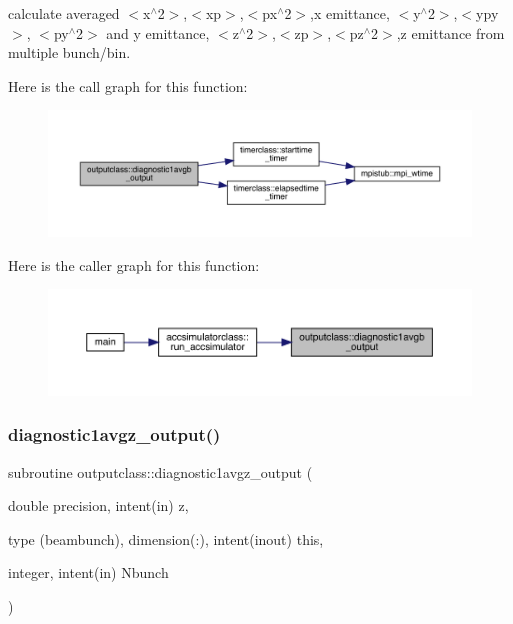 calculate averaged $<$x$^\wedge$2$>$,$<$xp$>$,$<$px$^\wedge$2$>$,x emittance, $<$y$^\wedge$2$>$,$<$ypy$>$, $<$py$^\wedge$2$>$ and y emittance, $<$z$^\wedge$2$>$,$<$zp$>$,$<$pz$^\wedge$2$>$,z emittance from multiple bunch/bin. 

Here is the call graph for this function\+:\nopagebreak
\begin{figure}[H]
\begin{center}
\leavevmode
\includegraphics[width=350pt]{namespaceoutputclass_a42165712a4636aa78bacdd26efa4bae9_cgraph}
\end{center}
\end{figure}
Here is the caller graph for this function\+:\nopagebreak
\begin{figure}[H]
\begin{center}
\leavevmode
\includegraphics[width=350pt]{namespaceoutputclass_a42165712a4636aa78bacdd26efa4bae9_icgraph}
\end{center}
\end{figure}
\mbox{\label{namespaceoutputclass_a4a7e188c45ca9b8099c7715873d9324a}} 
\subsubsection{\texorpdfstring{diagnostic1avgz\_output()}{diagnostic1avgz\_output()}}
{\footnotesize\ttfamily subroutine outputclass\+::diagnostic1avgz\+\_\+output (\begin{DoxyParamCaption}\item[{double precision, intent(in)}]{z,  }\item[{type (beambunch), dimension(\+:), intent(inout)}]{this,  }\item[{integer, intent(in)}]{Nbunch }\end{DoxyParamCaption})}



